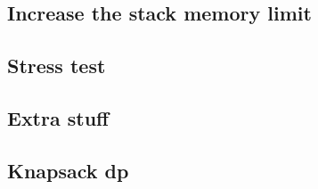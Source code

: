 \subsection{Increase the stack memory limit}
\raggedbottom
\hrulefill
\subsection{Stress test}
\raggedbottom
\hrulefill

\subsection{Extra stuff}
\raggedbottom 
\hrulefill

\subsection{Knapsack dp}
\raggedbottom
\hrulefill
